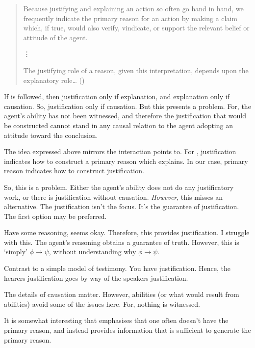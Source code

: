 \documentclass[10pt]{article}
\begin{document}
\begin{note}[Davidson]
  \begin{quote}
    Because justifying and explaining an action so often go hand in hand, we frequently indicate the primary reason for an action by making a claim which, if true, would also verify, vindicate, or support the relevant belief or attitude of the agent.

    \vdots

    The justifying role of a reason, given this interpretation, depends upon the explanatory role\dots
    \nolinebreak
    \mbox{}\hfill(\cite[8]{Davidson:2001aa})
  \end{quote}

  If \citeauthor{Davidson:2001aa} is followed, then justification only if explanation, and explanation only if causation.
  So, justification only if causation.
  But this presents a problem.
  For, the agent's ability has not been witnessed, and therefore the justification that would be constructed cannot stand in any causal relation to the agent adopting an attitude toward the conclusion.

  The idea expressed above mirrors the interaction \citeauthor{Davidson:2001aa} points to.
  For \citeauthor{Davidson:2001aa}, justification indicates how to construct a primary reason which explains.
  In our case, primary reason indicates how to construct justification.

  So, this is a problem.
  {
    \color{red}
    Either the agent's ability does not do any justificatory work, or there is justification without causation.
    \emph{However}, this misses an alternative.
    The justification isn't the focus.
    It's the guarantee of justification.
  }
  The first option may be preferred.

  Have some reasoning, seems okay.
  Therefore, this provides justification.
  I struggle with this.
  The agent's reasoning obtains a guarantee of truth.
  However, this is `simply' \(\phi \rightarrow \psi\), without understanding why \(\phi \rightarrow \psi\).

  Contrast to a simple model of testimony.
  You have justification.
  Hence, the hearers justification goes by way of the speakers justification.

  The details of causation matter.
  However, abilities (or what would result from abilities) avoid some of the issues here.
  For, nothing is witnessed.
 
  It is somewhat interesting that \citeauthor{Davidson:2001aa} emphasises that one often doesn't have the primary reason, and instead provides information that is sufficient to generate the primary reason.


\end{note}
\end{document}
